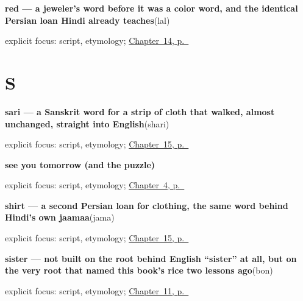 \noindent\begin{minipage}[t]{\linewidth}
\raggedright
\textbf{red — a jeweler's word before it was a color word, and the identical Persian loan Hindi already teaches}\enspace\emph{}\enspace(lal)\par
\footnotesize explicit focus: script, etymology; \hyperref[ch:bn-five-colors]{Chapter~14, p.~\pageref*{ch:bn-five-colors}}
\end{minipage}\par\smallskip

\section*{S}

\noindent\begin{minipage}[t]{\linewidth}
\raggedright
\textbf{sari — a Sanskrit word for a strip of cloth that walked, almost unchanged, straight into English}\enspace\emph{}\enspace(shari)\par
\footnotesize explicit focus: script, etymology; \hyperref[ch:bn-cloth-shirt-sari-glasses]{Chapter~15, p.~\pageref*{ch:bn-cloth-shirt-sari-glasses}}
\end{minipage}\par\smallskip

\noindent\begin{minipage}[t]{\linewidth}
\raggedright
\textbf{see you tomorrow (and the  puzzle)}\enspace\emph{  }\par
\footnotesize explicit focus: script, etymology; \hyperref[ch:farewells]{Chapter~4, p.~\pageref*{ch:farewells}}
\end{minipage}\par\smallskip

\noindent\begin{minipage}[t]{\linewidth}
\raggedright
\textbf{shirt — a second Persian loan for clothing, the same word behind Hindi's own jaamaa}\enspace\emph{}\enspace(jama)\par
\footnotesize explicit focus: script, etymology; \hyperref[ch:bn-cloth-shirt-sari-glasses]{Chapter~15, p.~\pageref*{ch:bn-cloth-shirt-sari-glasses}}
\end{minipage}\par\smallskip

\noindent\begin{minipage}[t]{\linewidth}
\raggedright
\textbf{sister — not built on the root behind English \textquotedblleft{}sister\textquotedblright{} at all, but on the very root that named this book's rice two lessons ago}\enspace\emph{}\enspace(bon)\par
\footnotesize explicit focus: script, etymology; \hyperref[ch:bn-friend-family-brother-sister]{Chapter~11, p.~\pageref*{ch:bn-friend-family-brother-sister}}
\end{minipage}\par\smallskip

